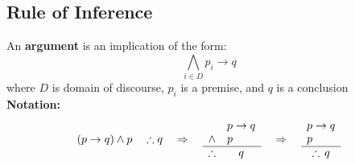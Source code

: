 \documentclass[11pt]{article}
\begin{document}
\subsection{Rule of Inference}
An \textbf{argument} is an implication of the form:
\[
    \bigwedge_{i\in D} p_i \rightarrow q
\]
where $D$ is domain of discourse, $p_i$ is a premise, and $q$ is a conclusion\\
\textbf{Notation:}
\[
    (p \rightarrow q) \land p \quad\therefore q \quad\Rightarrow\quad
    \begin{array}{ll}
        & p \to q \\
        \land & p \\
        \hline \therefore & \multicolumn{1}{c}{q}
    \end{array}
    \quad\Rightarrow\quad
    \begin{array}{l}
        p \to q \\
        p \\
        \hline
        \multicolumn{1}{c}{\therefore \,q}
    \end{array}
\]
\end{document}
